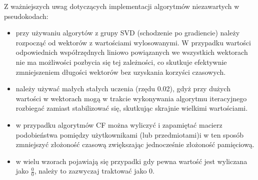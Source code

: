 \documentclass{pracamgr}
\begin{document}
   Z ważniejszych uwag dotyczących implementacji algorytmów niezawartych w pseudokodach:
   \begin{itemize}\itemsep1pt \parskip0pt 
    \item przy używaniu algorytów z grupy SVD (schodzenie po gradiencie) należy rozpocząć od wektorów z wartościami wylosowanymi.
     W przypadku wartości odpowiednich współrzędnych liniowo powiązanych we wszystkich wektorach nie ma możliwości pozbycia się tej zależności,
     co skutkuje efektywnie zmniejszeniem długości wektorów bez uzyskania korzyści czasowych.%
    \item należy używać małych stałych uczenia (rzędu 0.02), gdyż przy dużych wartości w wektorach mogą w trakcie wykonywania algorytmu
     iteracyjnego rozbiegać zamiast stabilizować się, skutkując skrajnie wielkimi wartościami.%
    \item w przypadku algorytmów CF można wyliczyć i zapamiętać macierz podobieństwa pomiędzy użytkownikami (lub przedmiotami)i w ten sposób
     zmniejszyć złożoność czasową zwiększając jednocześnie złożoność pamięciową.
    \item w wielu wzorach pojawiają się przypadki gdy pewna wartość jest wyliczana jako $\frac{0}{0}$, należy to zazwyczaj traktować jako $0$.
   \end{itemize}
\end{document}
